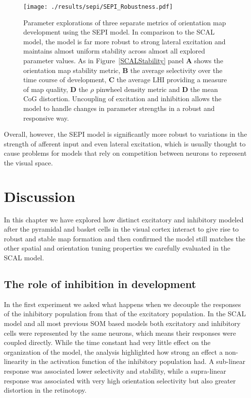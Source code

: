 \begin{figure}
	\centering
        \texttt{[image: ./results/sepi/SEPI\_Robustness.pdf]}
	\caption{Parameter explorations of three separate metrics of
      orientation map development using the SEPI model. In comparison
      to the SCAL model, the model is far more robust to strong
      lateral excitation and maintains almost uniform stability across
      almost all explored parameter values. As in
      Figure~\ref{SCALStability} panel \textbf{A} shows the
      orientation map stability metric, \textbf{B} the average
      selectivity over the time course of development, \textbf{C} the
      average LHI providing a measure of map quality, \textbf{D} the
      $\rho$ pinwheel density metric and \textbf{D} the mean CoG
      distortion. Uncoupling of excitation and inhibition allows the
      model to handle changes in parameter strengths in a robust and
      responsive way.}
	\label{SEPIStability}
\end{figure}

Overall, however, the SEPI model is significantly more robust to
variations in the strength of afferent input and even lateral
excitation, which is usually thought to cause problems for models
that rely on competition between neurons to represent the visual
space.

\section{Discussion}

In this chapter we have explored how distinct excitatory and
inhibitory modeled after the pyramidal and basket cells in the visual
cortex interact to give rise to robust and stable map formation and
then confirmed the model still matches the other spatial and
orientation tuning properties we carefully evaluated in the SCAL
model.

\subsection{The role of inhibition in development}

In the first experiment we asked what happens when we decouple the
responses of the inhibitory population from that of the excitatory
population. In the SCAL model and all most previous SOM based models
both excitatory and inhibitory cells were represented by the same
neurons, which means their responses were coupled directly. While the
time constant had very little effect on the organization of the model,
the analysis highlighted how strong an effect a non-linearity in the
activation function of the inhibitory population had. A sub-linear
response was associated lower selectivity and stability, while a
supra-linear response was associated with very high orientation
selectivity but also greater distortion in the retinotopy.

